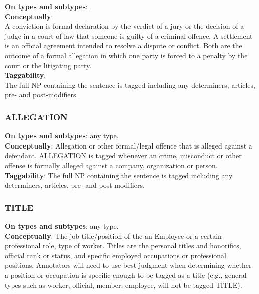 \justify
\noindent\textbf{On types and subtypes}: .\\[6pt]
\noindent\textbf{Conceptually}:\\
A conviction is formal declaration by the verdict of a jury or the decision of a judge in a court of law that someone is guilty of a criminal offence.
A settlement is an official agreement intended to resolve a dispute or conflict.
Both are the outcome of a formal allegation in which one party is forced to a penalty by the court or the litigating party.
\\[6pt]
\noindent\textbf{Taggability}:\\
The full NP containing the sentence is tagged including any determiners, articles, pre- and post-modifiers.

\vspace{0.5cm}

\subsubsection{ALLEGATION}

\justify
\noindent\textbf{On types and subtypes}: any  type.\\[6pt]
\noindent\textbf{Conceptually}:
Allegation or other formal/legal offence that is alleged against a defendant.
ALLEGATION is tagged whenever an crime, misconduct or other offense is formally alleged against a company, organization or person.
\\[6pt]
\noindent\textbf{Taggability}:
The full NP containing the sentence is tagged including any determiners, articles, pre- and post-modifiers.

\vspace{0.5cm}

\subsubsection{TITLE}

\justify
\noindent\textbf{On types and subtypes}: any  type.\\[6pt]
\noindent\textbf{Conceptually}:
The job title/position of the an Employee or a certain professional role, type of worker.
Titles are the personal titles and honorifics, official rank or status, and specific employed occupations or professional positions. Annotators will need to use best judgment when determining whether a position or occupation is specific enough to be tagged as a title (e.g., general types such as worker, official, member, employee, will not be tagged TITLE).\\[6pt]

